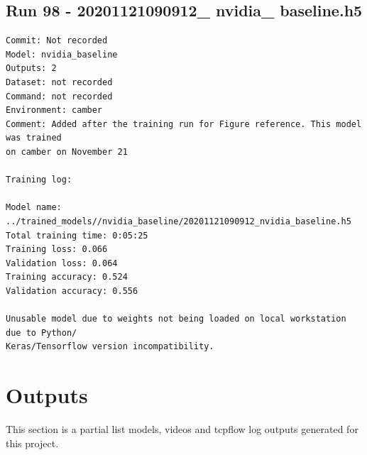 \subsection{Run 98 - 20201121090912\_ nvidia\_ baseline.h5 }
\label{app_res:98}
\begin{verbatim}
Commit: Not recorded
Model: nvidia_baseline
Outputs: 2
Dataset: not recorded
Command: not recorded
Environment: camber
Comment: Added after the training run for Figure reference. This model was trained
on camber on November 21

Training log:

Model name: ../trained_models//nvidia_baseline/20201121090912_nvidia_baseline.h5
Total training time: 0:05:25
Training loss: 0.066
Validation loss: 0.064
Training accuracy: 0.524
Validation accuracy: 0.556

Unusable model due to weights not being loaded on local workstation due to Python/
Keras/Tensorflow version incompatibility.
\end{verbatim}



\section{Outputs}
\label{app_res:outputs}
This section is a partial list models, videos and tcpflow log outputs generated for this project.
